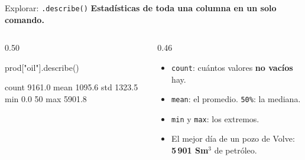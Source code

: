 \documentclass[aspectratio=169, 11pt]{beamer}
\begin{document}
\begin{frame}[fragile,shrink=15]{Explorar: \texttt{.describe()}}
  \vspace{-4pt}
  {\small\color{arcaDark}\bfseries
    Estadísticas de toda una columna en un solo comando.}

  \vspace{4pt}
  \begin{columns}[T]
    \begin{column}{0.50\textwidth}
      \begin{pyblock}
prod["oil"].describe()
      \end{pyblock}
      \vspace{2pt}
      \begin{outputblock}
count     9161.0
mean      1095.6
std       1323.5
min          0.0
50%
max       5901.8
      \end{outputblock}
    \end{column}

    \begin{column}{0.46\textwidth}
      {\scriptsize\color{textMuted}
      \begin{itemize}\setlength{\itemsep}{5pt}
        \item[{\color{arcaRed}\scriptsize\faArrowRight}]
          \texttt{count}: cuántos valores \textbf{no vacíos} hay.
        \item[{\color{arcaRed}\scriptsize\faArrowRight}]
          \texttt{mean}: el promedio.
          \texttt{50\%}: la mediana.
        \item[{\color{arcaRed}\scriptsize\faArrowRight}]
          \texttt{min} y \texttt{max}: los extremos.
        \item[{\color{codeGreen}\scriptsize\faCheck}]
          El mejor día de un pozo de Volve:
          \textbf{5\,901 Sm\(^3\)} de petróleo.
      \end{itemize}
      }
    \end{column}
  \end{columns}
\end{frame}
\end{document}
